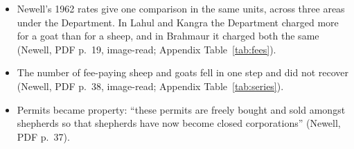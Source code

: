 \documentclass[11pt,a4paper]{article}
\newcommand{\cit}[1]{{\small(#1)}}
\begin{document}
\begin{itemize}
  the two fees cannot be compared per head per year \cit{Appendix
  Table~\ref{tab:fees}}.
\item Newell's 1962 rates give one comparison in the same units, across three
  areas under the Department. In Lahul and Kangra the Department charged more
  for a goat than for a sheep, and in Brahmaur it charged both the same \cit{Newell, PDF p.~19,
  image-read; Appendix Table~\ref{tab:fees}}.
\item The number of fee-paying sheep and goats fell in one step and did not
  recover \cit{Newell, PDF p.~38, image-read; Appendix
  Table~\ref{tab:series}}.
\item Permits became property: \enquote{these permits are freely bought and sold
  amongst shepherds so that shepherds have now become closed corporations}
  \cit{Newell, PDF p.~37}.
\end{itemize}
\end{document}
